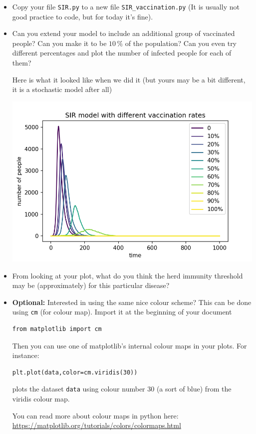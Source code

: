 \documentclass[pdflatex,a4paper]{article}
\begin{document}
\begin{itemize}
\item
Copy your file \verb=SIR.py= to a new file \verb=SIR_vaccination.py= (It is usually not good practice to code, but for today it's fine).
\item
Can you extend your model to include an additional group of vaccinated people? Can you make it to be \(10\,\%\) of the population? Can you even try different percentages and plot the number of infected people for each of them? 

Here is what it looked like when we did it (but yours may be a bit different, it is a stochastic model after all)

\includegraphics{SIR_vaccine.png}

\item

From looking at your plot, what do you think the herd immunity threshold may be (approximately) for this particular disease?

\newpage

\item
\textbf{Optional:} Interested in using the same nice colour scheme? This can be done using \verb=cm= (for colour map). Import it at the beginning of your document

\begin{lstlisting}
from matplotlib import cm
\end{lstlisting}

Then you can use one of matplotlib's internal colour maps in your plots. For instance:

\begin{lstlisting}
plt.plot(data,color=cm.viridis(30))
\end{lstlisting}

plots the dataset \verb=data= using colour number 30 (a sort of blue) from the viridis colour map. 

You can read more about colour maps in python here: \url{https://matplotlib.org/tutorials/colors/colormaps.html}

\end{itemize}
\end{document}

